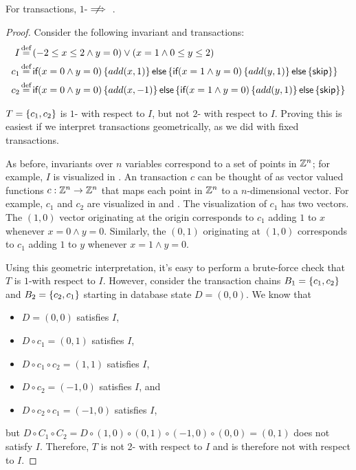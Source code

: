 \begin{claim}\label{clm:imp-1-iconfluence}
  For \imp{} transactions, $1$-\iconfluence $\centernot \implies$ \iconfluence.
\end{claim}
\begin{proof}
  Consider the following invariant and \imp{} transactions:
  \begin{align*}
    I &\defeq
      (-2 \leq x \leq 2 \land y = 0) \lor (x = 1 \land 0 \leq y \leq 2) \\
    c_1 &\defeq \impif{x = 0 \land y = 0}{
      add(x, 1)
    }{\impif{x = 1 \land y = 0} {
      add(y, 1)
    }{
      \impskip
    }} \\
    c_2 &\defeq \impif{x = 0 \land y = 0}{
      add(x, -1)
    }{\impif{x = 1 \land y = 0} {
      add(y, 1)
    }{
      \impskip
    }}
  \end{align*}

  $T = \left\{c_1, c_2\right\}$ is $1$-\iconfluent{} with respect to $I$, but not
  $2$-\iconfluent{} with respect to $I$. Proving this is easiest if we
  interpret \imp{} transactions geometrically, as we did with fixed
  transactions.

  As before, invariants over $n$ variables correspond to a set of points in
  $\mathbb{Z}^n$; for example, $I$ is visualized in . An \imp{}
  transaction $c$ can be thought of as vector valued functions $c: \mathbb{Z}^n \to
  \mathbb{Z}^n$ that maps each point in $\mathbb{Z}^n$ to a $n$-dimensional vector. For
  example, $c_1$ and $c_2$ are visualized in  and .
  The visualization of $c_1$ has two vectors. The $(1, 0)$ vector originating
  at the origin corresponds to $c_1$ adding $1$ to $x$ whenever $x = 0 \land y
  = 0$. Similarly, the $(0, 1)$ originating at $(1, 0)$ corresponds to $c_1$
  adding $1$ to $y$ whenever $x = 1 \land y = 0$.

  Using this geometric interpretation, it's easy to perform a brute-force check
  that $T$ is $1$-\iconfluent with respect to $I$. However, consider the
  transaction chains $B_1 = \left\{c_1, c_2\right\}$ and $B_2 = \left\{c_2, c_1\right\}$ starting
  in database state $D = (0, 0)$. We know that
  \begin{itemize}
    \item $D = (0, 0)$ satisfies $I$,
    \item $D \circ c_1 = (0, 1)$ satisfies $I$,
    \item $D \circ c_1 \circ c_2 = (1, 1)$ satisfies $I$,
    \item $D \circ c_2 = (-1, 0)$ satisfies $I$, and
    \item $D \circ c_2 \circ c_1 = (-1, 0)$ satisfies $I$,
  \end{itemize}
  but $D \circ C_1 \circ C_2 = D \circ (1, 0) \circ (0, 1) \circ (-1, 0) \circ
  (0, 0) = (0, 1)$ does not satisfy $I$. Therefore, $T$ is not 2-\iconfluent
  with respect to $I$ and is therefore not \iconfluent with respect to $I$.
\end{proof}

